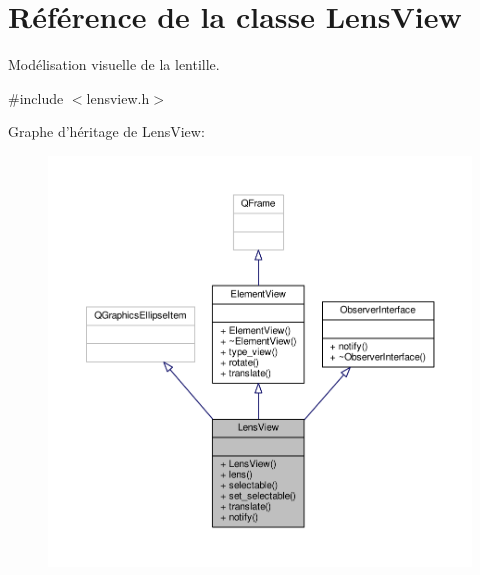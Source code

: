 \hypertarget{classLensView}{\section{Référence de la classe Lens\+View}
\label{classLensView}
}


Modélisation visuelle de la lentille.  




{\ttfamily \#include $<$lensview.\+h$>$}



Graphe d'héritage de Lens\+View\+:
\nopagebreak
\begin{figure}[H]
\begin{center}
\leavevmode
\includegraphics[width=350pt]{d3/d0e/classLensView__inherit__graph}
\end{center}
\end{figure}



